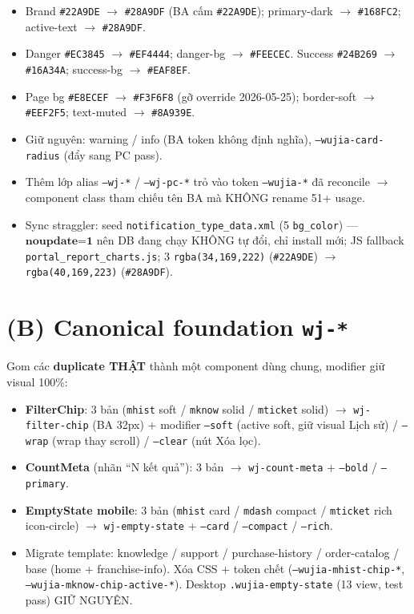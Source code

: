 \begin{itemize}
  \item Brand \texttt{\#22A9DE} \(\rightarrow\) \texttt{\#28A9DF} (BA cấm \texttt{\#22A9DE});
        primary-dark \(\rightarrow\) \texttt{\#168FC2}; active-text \(\rightarrow\) \texttt{\#28A9DF}.
  \item Danger \texttt{\#EC3845} \(\rightarrow\) \texttt{\#EF4444}; danger-bg \(\rightarrow\)
        \texttt{\#FEECEC}. Success \texttt{\#24B269} \(\rightarrow\) \texttt{\#16A34A};
        success-bg \(\rightarrow\) \texttt{\#EAF8EF}.
  \item Page bg \texttt{\#E8ECEF} \(\rightarrow\) \texttt{\#F3F6F8} (gỡ override 2026-05-25);
        border-soft \(\rightarrow\) \texttt{\#EEF2F5}; text-muted \(\rightarrow\) \texttt{\#8A939E}.
  \item Giữ nguyên: warning / info (BA token không định nghĩa), \texttt{--wujia-card-radius}
        (đẩy sang PC pass).
  \item Thêm lớp alias \texttt{--wj-*} / \texttt{--wj-pc-*} trỏ vào token \texttt{--wujia-*}
        đã reconcile \(\rightarrow\) component class tham chiếu tên BA mà KHÔNG rename 51+ usage.
  \item Sync straggler: seed \texttt{notification\_type\_data.xml} (5 \texttt{bg\_color}) ---
        \(\textbf{noupdate=1}\) nên DB đang chạy KHÔNG tự đổi, chỉ install mới; JS fallback
        \texttt{portal\_report\_charts.js}; 3 \texttt{rgba(34,169,222)} (\texttt{\#22A9DE})
        \(\rightarrow\) \texttt{rgba(40,169,223)} (\texttt{\#28A9DF}).
\end{itemize}

\section{(B) Canonical foundation \texttt{wj-*}}

Gom các \textbf{duplicate THẬT} thành một component dùng chung, modifier giữ visual 100\%:

\begin{itemize}
  \item \textbf{FilterChip}: 3 bản (\texttt{mhist} soft / \texttt{mknow} solid / \texttt{mticket}
        solid) \(\rightarrow\) \texttt{wj-filter-chip} (BA 32px) + modifier \texttt{--soft}
        (active soft, giữ visual Lịch sử) / \texttt{--wrap} (wrap thay scroll) / \texttt{--clear}
        (nút Xóa lọc).
  \item \textbf{CountMeta} (nhãn ``N kết quả''): 3 bản \(\rightarrow\) \texttt{wj-count-meta} +
        \texttt{--bold} / \texttt{--primary}.
  \item \textbf{EmptyState mobile}: 3 bản (\texttt{mhist} card / \texttt{mdash} compact /
        \texttt{mticket} rich icon-circle) \(\rightarrow\) \texttt{wj-empty-state} +
        \texttt{--card} / \texttt{--compact} / \texttt{--rich}.
  \item Migrate template: knowledge / support / purchase-history / order-catalog / base
        (home + franchise-info). Xóa CSS + token chết (\texttt{--wujia-mhist-chip-*},
        \texttt{--wujia-mknow-chip-active-*}). Desktop \texttt{.wujia-empty-state} (13 view,
        test pass) GIỮ NGUYÊN.
\end{itemize}

